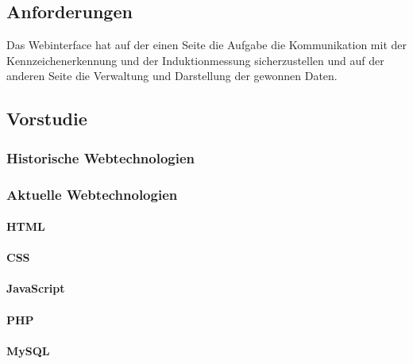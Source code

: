 \subsection{Anforderungen}
Das Webinterface hat auf der einen Seite die Aufgabe die Kommunikation mit der
Kennzeichenerkennung und der Induktionmessung sicherzustellen und auf der
anderen Seite die Verwaltung und Darstellung der gewonnen Daten.

\subsection{Vorstudie}
\subsubsection{Historische Webtechnologien}
\subsubsection{Aktuelle Webtechnologien}
\paragraph{HTML}
\paragraph{CSS}
\paragraph{JavaScript}
\paragraph{PHP}
\paragraph{MySQL}